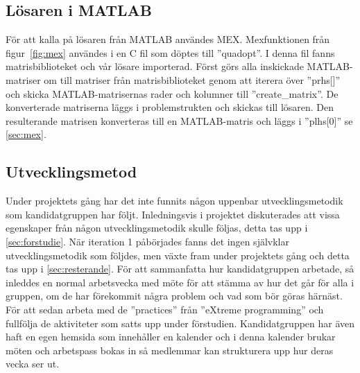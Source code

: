 \subsection{Lösaren i MATLAB}
För att kalla på lösaren från MATLAB användes MEX. Mexfunktionen från figur~\ref{fig:mex} användes i en C fil som döptes till ''quadopt''. I denna fil fanns matrisbiblioteket och vår lösare importerad. Först görs alla inskickade MATLAB-matriser om till matriser från matrisbiblioteket genom att iterera över ''prhs[]'' och skicka MATLAB-matrisernas rader och kolumner till ''create\_matrix''. De konverterade matriserna läggs i problemstrukten och skickas till lösaren. Den resulterande matrisen konverteras till en MATLAB-matris och läggs i ''plhs[0]'' se \ref{sec:mex}.

\subsection{Utvecklingsmetod}
Under projektets gång har det inte funnits någon uppenbar utvecklingsmetodik som kandidatgruppen har följt. Inledningsvis i projektet diskuterades att vissa egenskaper från någon utvecklingsmetodik skulle följas, detta tas upp i \ref{sec:forstudie}. När iteration 1 påbörjades fanns det ingen självklar utvecklingsmetodik som följdes, men växte fram under projektets gång och detta tas upp i \ref{sec:resterande}.
\newline
\newline
För att sammanfatta hur kandidatgruppen arbetade, så  inleddes en normal arbetsvecka med möte för att stämma av hur det går för alla i gruppen, om de har förekommit några problem och vad som bör göras härnäst. För att sedan arbeta med de ''practices'' från ''eXtreme programming'' och fullfölja de aktiviteter som satts upp under förstudien. 
\newline
\newline%
Kandidatgruppen har även haft en egen hemsida som innehåller en kalender och i denna kalender brukar möten och arbetspass bokas in så medlemmar kan strukturera upp hur deras vecka ser ut.

